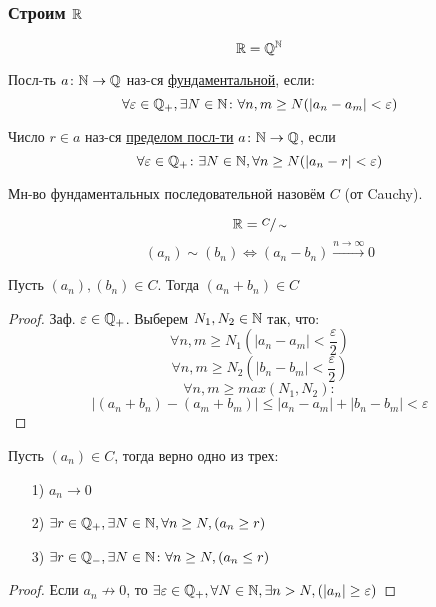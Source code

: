 \subsubsection{Строим $\mathbb{R}$}
\[
\mathbb{R} = \mathbb{Q}^{\mathbb{N}}
\]
\begin{definition}
Посл-ть $a \colon \mathbb{N} \rightarrow \mathbb{Q}$ наз-ся \underline{фундаментальной}, если:
\[
\forall \varepsilon \in \mathbb{Q}_+, \exists N \in \mathbb{N} \colon \forall n, m \geq N (\left|a_n - a_m\right| < \varepsilon)
\]
\end{definition}
\begin{definition}
Число $r \in a$ наз-ся \underline{пределом посл-ти} $a \colon \mathbb{N} \rightarrow \mathbb{Q}$, если
\[
\forall \varepsilon \in \mathbb{Q}_+ \colon \exists N \in \mathbb{N}, \forall n \geq N (\left|a_n - r\right| < \varepsilon)
\]
\end{definition}
\begin{symb}
Мн-во фундаментальных последовательной назовём $C$ (от Cauchy).
\end{symb}
\[
\mathbb{R} = \sfrac{C}{\sim}
\]
\[
  (a_n) \sim (b_n) \iff (a_n - b_n) \overset{n \rightarrow \infty}{\longrightarrow} 0
\]
\begin{statement}
Пусть $(a_n), (b_n) \in C$. Тогда $(a_n + b_n) \in C$
\end{statement}
\begin{proof}
Заф. $\varepsilon \in \mathbb{Q}_+$. Выберем $N_1, N_2 \in \mathbb{N}$ так, что:
\[
\forall n, m \geq N_1 (\left|a_n - a_m\right| < \frac{\varepsilon}{2})
\]
\[
\forall n, m \geq N_2 (\left|b_n - b_m\right| < \frac{\varepsilon}{2})
\]
\[
\forall n, m \geq max(N_1, N_2) \colon
\]
\[
  \left|(a_n + b_n) - (a_m + b_m)\right| \leq \left|a_n - a_m\right| + \left|b_n - b_m\right| < \varepsilon
\]
\end{proof}
\begin{lemma}
Пусть $(a_n) \in C$, тогда верно одно из трех:
\begin{itemize}
  \item [1) ] $a_n \rightarrow 0$
  \item [2) ] $\exists r \in \mathbb{Q}_+, \exists N \in \mathbb{N}, \forall n \geq N, (a_n \geq r)$
  \item [3) ] $\exists r \in \mathbb{Q}_-, \exists N \in \mathbb{N} \colon \forall n \geq N, (a_n \leq r)$
\end{itemize}
\end{lemma}
\begin{proof}
Если $a_n \not\rightarrow 0$, то $\exists \varepsilon \in \mathbb{Q}_+, \forall N \in \mathbb{N}, \exists n > N, (\left|a_n\right| \geq \varepsilon)$
\end{proof}
